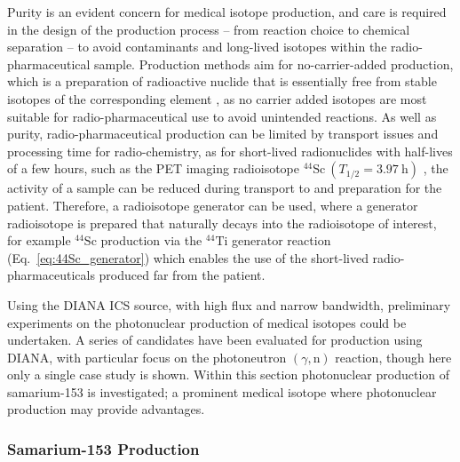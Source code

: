 \documentclass[../main.tex]{subfiles}
\begin{document}
Purity is an evident concern for medical isotope production, and care is required in the design of the production process -- from reaction choice to chemical separation -- to avoid contaminants and long-lived isotopes within the radio-pharmaceutical sample. Production methods aim for no-carrier-added production, which is a preparation of radioactive nuclide that is essentially free from stable isotopes of the corresponding element \cite{currie1994nomenclature,wolf1981synthesis,coenen2017consensus}, as no carrier added isotopes are most suitable for radio-pharmaceutical use to avoid unintended reactions. As well as purity, radio-pharmaceutical production can be limited by transport issues and processing time for radio-chemistry, as for short-lived radionuclides with half-lives of a few hours, such as the PET imaging radioisotope $^{44}\mathrm{Sc}~\left(T_{1/2}=3.97~\si{\hour}\right)$ \cite{roesch2012scandium,muller2014promising}, the activity of a sample can be reduced during transport to and preparation for the patient. Therefore, a radioisotope generator can be used, where a generator radioisotope is prepared that naturally decays into the radioisotope of interest, for example $^{44}\mathrm{Sc}$ production via the $^{44}\mathrm{Ti}$ generator reaction (Eq.~\ref{eq:44Sc_generator}) \cite{roesch2012scandium,muller2014promising} which enables the use of the short-lived radio-pharmaceuticals produced far from the patient.

Using the DIANA ICS source, with high flux and narrow bandwidth, preliminary experiments on the photonuclear production of medical isotopes could be undertaken. A series of candidates have been evaluated for production using DIANA, with particular focus on the photoneutron $\left(\gamma,\mathrm{n}\right)$ reaction, though here only a single case study is shown. Within this section photonuclear production of samarium-153 is investigated; a prominent medical isotope where photonuclear production may provide advantages.  

\subsubsection{Samarium-153 Production}
\end{document}
